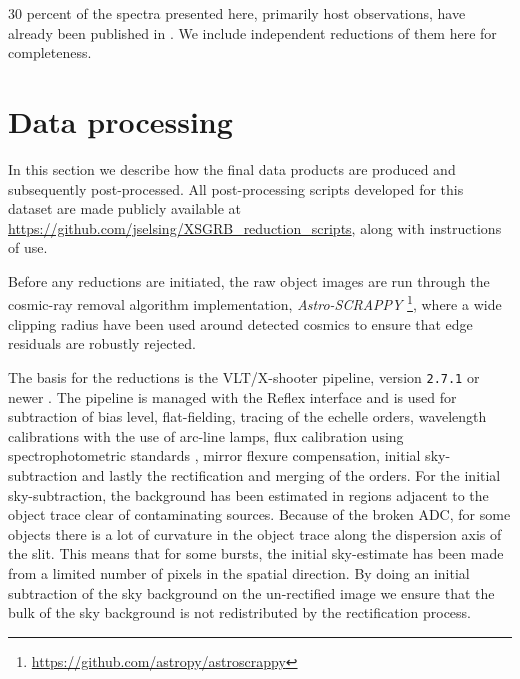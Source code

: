 \documentclass{aa}    %
\begin{document}
30 percent of the spectra presented here, primarily host observations, have
already been published in \citet{Kruhler2015}. We include independent
reductions of them here for completeness.

\section{Data processing} \label{proc}

In this section we describe how the final data products are produced and
subsequently post-processed. %
All post-processing scripts developed for this dataset are made publicly
available at \url{https://github.com/jselsing/XSGRB_reduction_scripts}, along
with instructions of use.

Before any reductions are initiated, the raw object images are run through the
cosmic-ray removal algorithm \citep{VanDokkum2001} implementation,
\textit{Astro-SCRAPPY} \footnote{\url{https://github.com/astropy/astroscrappy}},
where a wide clipping radius have been used around detected cosmics to ensure that edge residuals are
robustly rejected. 

The basis for the reductions is the VLT/X-shooter pipeline, version
\texttt{2.7.1} or newer \citep{Goldoni2006, Modigliani2010}. The pipeline is
managed with the Reflex interface \citep{Freudling2013} and is used for
subtraction of bias level, flat-fielding, tracing of the echelle orders,
wavelength calibrations with the use of arc-line lamps, flux calibration using
spectrophotometric standards \citep{Vernet2010, Hamuy1994}, mirror flexure
compensation, initial sky-subtraction and lastly the rectification and merging
of the orders. For the initial sky-subtraction, the background has been
estimated in regions adjacent to the object trace clear of contaminating
sources. Because of the broken ADC, for some objects there is a lot of curvature
in the object trace along the dispersion axis of the slit. This means that for
some bursts, the initial sky-estimate has been made from a limited number of
pixels in the spatial direction. By doing an initial subtraction of the sky
background on the un-rectified image we ensure that the bulk of the sky
background is not redistributed by the rectification process.
\end{document}
